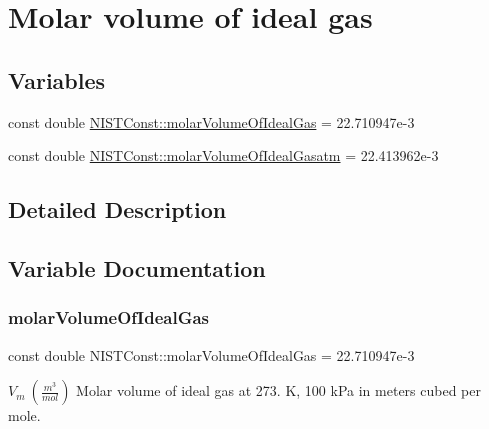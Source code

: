 \hypertarget{group___n_i_s_t_const-_molar_volume}{}\section{Molar volume of ideal gas}
\label{group___n_i_s_t_const-_molar_volume}
\subsection*{Variables}
\begin{DoxyCompactItemize}
\item 
const double \hyperlink{group___n_i_s_t_const-_molar_volume_ga666dc78c2b916ed12bcaf3ec15d7c4d3}{N\+I\+S\+T\+Const\+::molar\+Volume\+Of\+Ideal\+Gas} = 22.\+710947e-\/3
\item 
const double \hyperlink{group___n_i_s_t_const-_molar_volume_ga005e08baa33a25a474bd2287281883c4}{N\+I\+S\+T\+Const\+::molar\+Volume\+Of\+Ideal\+Gasatm} = 22.\+413962e-\/3
\end{DoxyCompactItemize}


\subsection{Detailed Description}


\subsection{Variable Documentation}
\mbox{\label{group___n_i_s_t_const-_molar_volume_ga666dc78c2b916ed12bcaf3ec15d7c4d3}} 
\subsubsection{\texorpdfstring{molar\+Volume\+Of\+Ideal\+Gas}{molarVolumeOfIdealGas}}
{\footnotesize\ttfamily const double N\+I\+S\+T\+Const\+::molar\+Volume\+Of\+Ideal\+Gas = 22.\+710947e-\/3}

$V_m \ (\frac{m^3}{mol})$ Molar volume of ideal gas at 273. K, 100 k\+Pa in meters cubed per mole. \mbox{\label{group___n_i_s_t_const-_molar_volume_ga005e08baa33a25a474bd2287281883c4}} 

